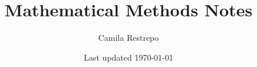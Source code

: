 \documentclass{notes}
\title{\bfseries Mathematical Methods Notes}
\author{Camila Restrepo}
\date{Last updated \today}
\begin{document}
\maketitle
\toccontents
\frontpagewarning


\end{document}
